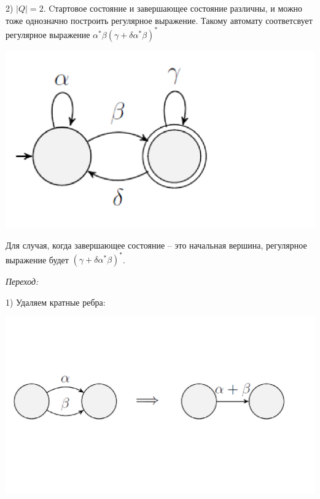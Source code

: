 2) $|Q| = 2$. Cтартовое состояние и завершающее состояние различны, и можно тоже однозначно построить регулярное выражение. Такому автомату соответсвует регулярное выражение $\alpha^*\beta(\gamma + \delta \alpha^* \beta)^*$
\newline
\begin{minipage}[r]{0.1\linewidth} 
    \includegraphics[width=4\linewidth]{images/1_4_4.png}
\end{minipage} 

Для случая, когда завершающее состояние -- это начальная вершина, регулярное выражение будет $(\gamma + \delta \alpha^* \beta)^*$.

\textit{Переход:}

1) Удаляем кратные ребра:
\begin{minipage}[r]{0.2\linewidth} 
    \includegraphics[width=2.5\linewidth]{images/1_4_5.png}
\end{minipage} 

